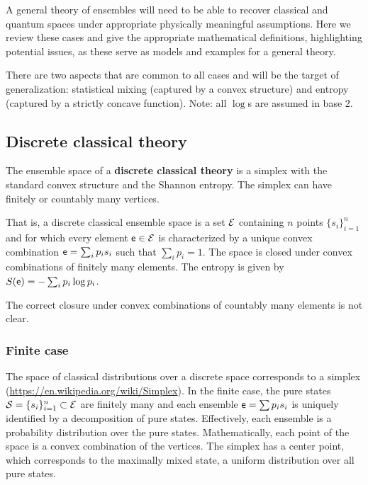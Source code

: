 A general theory of ensembles will need to be able to recover classical and quantum spaces under appropriate physically meaningful assumptions. Here we review these cases and give the appropriate mathematical definitions, highlighting potential issues, as these serve as models and examples for a general theory.

There are two aspects that are common to all cases and will be the target of generalization: statistical mixing (captured by a convex structure) and entropy (captured by a strictly concave function). Note: all $\log$s are assumed in base 2.

\subsection{Discrete classical theory}

\begin{defn}
	The ensemble space of a \textbf{discrete classical theory} is a simplex with the standard convex structure and the Shannon entropy. The simplex can have finitely or countably many vertices.
	
	That is, a discrete classical ensemble space is a set $\mathcal{E}$ containing $n$ points $\{s_i\}^n_{i=1}$ and for which every element $\mathsf{e} \in \mathcal{E}$ is characterized by a unique convex combination $\mathsf{e} = \sum_i p_i s_i$ such that $\sum_i p_i = 1$. The space is closed under convex combinations of finitely many elements. The entropy is given by $S(\mathsf{e}) = - \sum_i p_i \log p_i$.
\end{defn}

\begin{remark}
	The correct closure under convex combinations of countably many elements is not clear.
\end{remark}

\subsubsection{Finite case}

The space of classical distributions over a discrete space corresponds to a simplex (\url{https://en.wikipedia.org/wiki/Simplex}). In the finite case, the pure states $\mathcal{S} = \{s_i\}_{i=1}^{n} \subset \mathcal{E}$ are finitely many and each ensemble $\mathsf{e} = \sum p_i s_i$ is uniquely identified by a decomposition of pure states. Effectively, each ensemble is a probability distribution over the pure states. Mathematically, each point of the space is a convex combination of the vertices. The simplex has a center point, which corresponds to the maximally mixed state, a uniform distribution over all pure states. 

